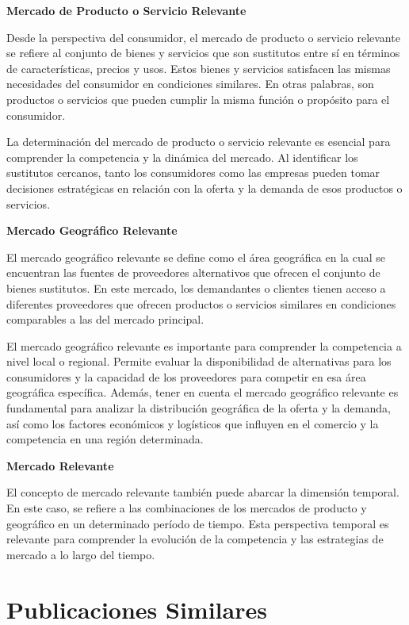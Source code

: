 \documentclass[
  a4paper,
]{article}
\theoremstyle{definition}
\theoremstyle{remark}
\begin{document}
\textbf{Mercado de Producto o Servicio Relevante}

Desde la perspectiva del consumidor, el mercado de producto o servicio
relevante se refiere al conjunto de bienes y servicios que son
sustitutos entre sí en términos de características, precios y usos.
Estos bienes y servicios satisfacen las mismas necesidades del
consumidor en condiciones similares. En otras palabras, son productos o
servicios que pueden cumplir la misma función o propósito para el
consumidor.

La determinación del mercado de producto o servicio relevante es
esencial para comprender la competencia y la dinámica del mercado. Al
identificar los sustitutos cercanos, tanto los consumidores como las
empresas pueden tomar decisiones estratégicas en relación con la oferta
y la demanda de esos productos o servicios.

\textbf{Mercado Geográfico Relevante}

El mercado geográfico relevante se define como el área geográfica en la
cual se encuentran las fuentes de proveedores alternativos que ofrecen
el conjunto de bienes sustitutos. En este mercado, los demandantes o
clientes tienen acceso a diferentes proveedores que ofrecen productos o
servicios similares en condiciones comparables a las del mercado
principal.

El mercado geográfico relevante es importante para comprender la
competencia a nivel local o regional. Permite evaluar la disponibilidad
de alternativas para los consumidores y la capacidad de los proveedores
para competir en esa área geográfica específica. Además, tener en cuenta
el mercado geográfico relevante es fundamental para analizar la
distribución geográfica de la oferta y la demanda, así como los factores
económicos y logísticos que influyen en el comercio y la competencia en
una región determinada.

\textbf{Mercado Relevante}

El concepto de mercado relevante también puede abarcar la dimensión
temporal. En este caso, se refiere a las combinaciones de los mercados
de producto y geográfico en un determinado período de tiempo. Esta
perspectiva temporal es relevante para comprender la evolución de la
competencia y las estrategias de mercado a lo largo del tiempo.

\hypertarget{publicaciones-similares}{%
\section{Publicaciones Similares}\label{publicaciones-similares}}
\end{document}
